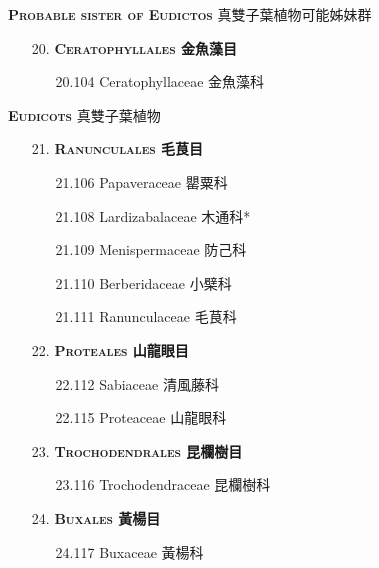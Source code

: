 \vspace{2ex} 
\noindent \normalsize\textsc{\textbf{Probable sister of Eudictos} 真雙子葉植物可能姊妹群}\selectfont \\
\footnotesize\selectfont
\begin{enumerate}
  \item[20. ] \textbf{\textsc{Ceratophyllales} 金魚藻目} 
    \begin{enumerate}
      \item[20.104] Ceratophyllaceae 金魚藻科  
        
    \end{enumerate}
\end{enumerate}
\vspace{2ex} 
\noindent \normalsize\textsc{\textbf{Eudicots} 真雙子葉植物}\selectfont \\
\footnotesize\selectfont
\begin{enumerate}
  \item[21. ] \textbf{\textsc{Ranunculales} 毛茛目} 
    \begin{enumerate}
      \item[21.106] Papaveraceae 罌粟科  
        
      \item[21.108] Lardizabalaceae 木通科* 
        
      \item[21.109] Menispermaceae 防己科  
        
      \item[21.110] Berberidaceae 小檗科  
        
      \item[21.111] Ranunculaceae 毛茛科  
        
    \end{enumerate}
  \item[22. ] \textbf{\textsc{Proteales} 山龍眼目} 
    \begin{enumerate}
      \item[22.112] Sabiaceae 清風藤科  
        
      \item[22.115] Proteaceae 山龍眼科  
        
    \end{enumerate}
  \item[23. ] \textbf{\textsc{Trochodendrales} 昆欄樹目} 
    \begin{enumerate}
      \item[23.116] Trochodendraceae 昆欄樹科  
        
    \end{enumerate}
  \item[24. ] \textbf{\textsc{Buxales} 黃楊目} 
    \begin{enumerate}
      \item[24.117] Buxaceae 黃楊科  
        
    \end{enumerate}
\end{enumerate}
